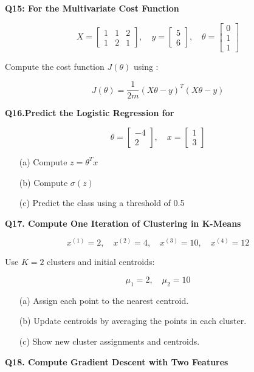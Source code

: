\documentclass{article}
\begin{document}
\vspace{1\baselineskip}

\textbf{Q15: For the Multivariate Cost Function}

\[
X = 
\begin{bmatrix}
1 & 1 & 2 \\
1 & 2 & 1
\end{bmatrix},
\quad
y = 
\begin{bmatrix}
5 \\
6
\end{bmatrix},
\quad
\theta = 
\begin{bmatrix}
0 \\
1 \\
1
\end{bmatrix}
\]

Compute the cost function \( J(\theta) \) using :

\[
J(\theta) = \frac{1}{2m}(X\theta - y)^T (X\theta - y)
\]

\vspace{1\baselineskip}

\textbf{Q16.Predict the  Logistic Regression for }

\[
\theta = 
\begin{bmatrix}
-4 \\
2
\end{bmatrix},
\quad
x = 
\begin{bmatrix}
1 \\
3
\end{bmatrix}
\]

\begin{itemize}
    \item[(a)] Compute \( z = \theta^T x \)
    \item[(b)] Compute \( \sigma(z)\)
    \item[(c)] Predict the class using a threshold of 0.5
\end{itemize}

\vspace{1\baselineskip}

\textbf{Q17. Compute One Iteration of Clustering in K-Means}

\[
x^{(1)} = 2, \quad x^{(2)} = 4, \quad x^{(3)} = 10, \quad x^{(4)} = 12
\]

Use \( K = 2 \) clusters and initial centroids:

\[
\mu_1 = 2, \quad \mu_2 = 10
\]

\begin{itemize}
    \item[(a)] Assign each point to the nearest centroid.

    \item[(b)] Update centroids by averaging the points in each cluster.

    \item[(c)] Show new cluster assignments and centroids.
\end{itemize}
\textbf{Q18. Compute Gradient Descent with Two Features}
\end{document}
